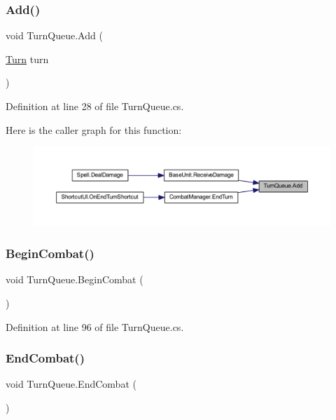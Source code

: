 \subsubsection{\texorpdfstring{Add()}{Add()}}
{\footnotesize\ttfamily void Turn\+Queue.\+Add (\begin{DoxyParamCaption}\item[{\mbox{\hyperlink{class_turn}{Turn}}}]{turn }\end{DoxyParamCaption})}



Definition at line 28 of file Turn\+Queue.\+cs.

Here is the caller graph for this function\+:
\nopagebreak
\begin{figure}[H]
\begin{center}
\leavevmode
\includegraphics[width=350pt]{class_turn_queue_aa677cc3ae9812e45a5b7e8932c199e27_icgraph}
\end{center}
\end{figure}
\mbox{\label{class_turn_queue_a7de50ac6b689f76c71d808962b6d1b86}} 
\subsubsection{\texorpdfstring{BeginCombat()}{BeginCombat()}}
{\footnotesize\ttfamily void Turn\+Queue.\+Begin\+Combat (\begin{DoxyParamCaption}{ }\end{DoxyParamCaption})}



Definition at line 96 of file Turn\+Queue.\+cs.

\mbox{\label{class_turn_queue_a9b3696b9a7672bbb8a79e3f0dc3ef393}} 
\subsubsection{\texorpdfstring{EndCombat()}{EndCombat()}}
{\footnotesize\ttfamily void Turn\+Queue.\+End\+Combat (\begin{DoxyParamCaption}{ }\end{DoxyParamCaption})}



